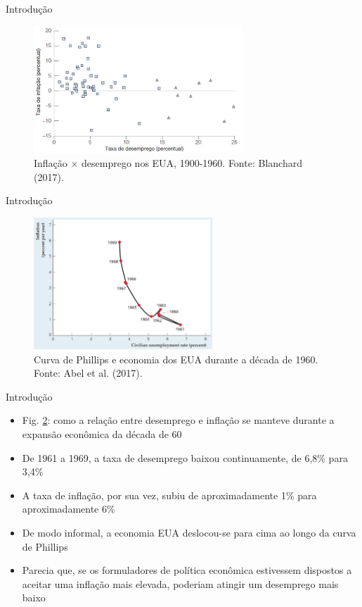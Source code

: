 \documentclass[10pt]{beamer}
\begin{document}
\begin{frame}{Introdução}
    \begin{figure}
        \centering
        \includegraphics[width=0.7\textwidth]{./figures/aula10_fig8.JPG}
        \caption{Inflação $\times$ desemprego nos EUA, 1900-1960. Fonte: Blanchard (2017).}
        \label{fig75}
    \end{figure}
\end{frame}

\begin{frame}{Introdução}
    \begin{figure}
        \centering
        \includegraphics[width=0.6\textwidth]{./figures/aula10_fig9.JPG}
        \caption{Curva de Phillips e economia dos EUA durante a década de 1960. Fonte: Abel et al. (2017).}
        \label{fig8}
    \end{figure}
\end{frame}

\begin{frame}{Introdução}
    \begin{itemize}
        \item Fig. \ref{fig8}: como a relação entre desemprego e inflação se manteve durante a expansão econômica da década de 60
        \bigskip
        \item De 1961 a 1969, a taxa de desemprego baixou continuamente, de 6,8\% para 3,4\%
        \bigskip
        \item A taxa de inflação, por sua vez, subiu de aproximadamente 1\% para aproximadamente 6\%
        \bigskip
        \item De modo informal, a economia EUA deslocou-se para cima ao longo da curva de Phillips
        \bigskip
        \item Parecia que, se os formuladores de política econômica estivessem dispostos a aceitar uma inflação mais elevada, poderiam atingir um desemprego mais baixo
    \end{itemize}
\end{frame}
\end{document}
